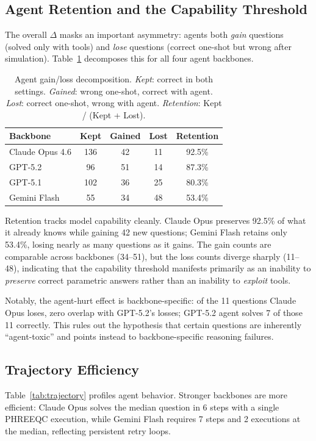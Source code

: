 \documentclass[sigconf,anonymous]{acmart}
\begin{document}
\subsection{Agent Retention and the Capability Threshold}
The overall $\Delta$ masks an important asymmetry:
agents both \emph{gain} questions (solved only with
tools) and \emph{lose} questions (correct one-shot
but wrong after simulation). Table~\ref{tab:retention}
decomposes this for all four agent backbones.

\begin{table}[h]
\centering
\small
\begin{tabular}{lcccc}
\toprule
Backbone & Kept & Gained & Lost & Retention \\
\midrule
Claude Opus 4.6 & 136 & 42 & 11 & 92.5\% \\
GPT-5.2 & 96 & 51 & 14 & 87.3\% \\
GPT-5.1 & 102 & 36 & 25 & 80.3\% \\
Gemini Flash & 55 & 34 & 48 & 53.4\% \\
\bottomrule
\end{tabular}
\caption{Agent gain/loss decomposition. \emph{Kept}:
correct in both settings. \emph{Gained}: wrong
one-shot, correct with agent. \emph{Lost}: correct
one-shot, wrong with agent. \emph{Retention}:
Kept / (Kept + Lost).}
\label{tab:retention}
\end{table}

Retention tracks model capability cleanly. Claude
Opus preserves 92.5\% of what it already knows while
gaining 42 new questions; Gemini Flash retains only
53.4\%, losing nearly as many questions as it gains.
The gain counts are comparable across backbones
(34--51), but the loss counts diverge sharply
(11--48), indicating that the capability threshold
manifests primarily as an inability to
\emph{preserve} correct parametric answers rather
than an inability to \emph{exploit} tools.

Notably, the agent-hurt effect is backbone-specific:
of the 11 questions Claude Opus loses, zero overlap
with GPT-5.2's losses; GPT-5.2 agent solves 7 of
those 11 correctly. This rules out the hypothesis
that certain questions are inherently ``agent-toxic''
and points instead to backbone-specific reasoning
failures.

\subsection{Trajectory Efficiency}
Table~\ref{tab:trajectory} profiles agent behavior.
Stronger backbones are more efficient: Claude Opus
solves the median question in 6 steps with a single
PHREEQC execution, while Gemini Flash requires 7
steps and 2 executions at the median, reflecting
persistent retry loops.
\end{document}
